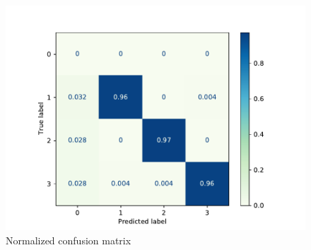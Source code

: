 \begin{figure}[h]
	\centering
	\includegraphics[width=1\linewidth]{figures/cm_bolb}
	\caption{Normalized confusion matrix}
	\label{fig:cmbolb}
\end{figure}

